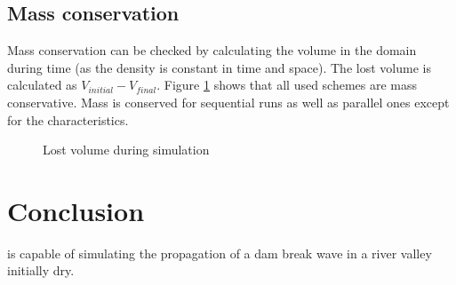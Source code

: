 \subsection{Mass conservation}

Mass conservation can be checked by calculating the volume in the domain during time (as the density is constant in time and space). The lost volume is calculated as $V_{initial} - V_{final}$.
Figure \ref{fig:malpasset:lostvol} shows that all used schemes are mass conservative. Mass is conserved for sequential runs as well as parallel ones except for the characteristics. 

\begin{figure}[H]
\centering
{}
\caption{Lost volume during simulation}
\label{fig:malpasset:lostvol}
\end{figure}

\section{Conclusion}
 is capable of simulating the propagation of a dam break wave in a river valley initially dry.


